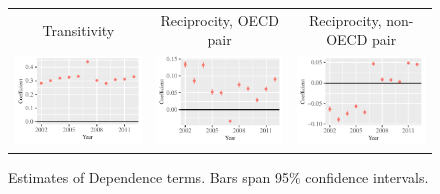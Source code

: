\documentclass[reqno,onecolumn,letterpaper,12pt]{article}
\begin{document}
{\begin{figure}[!h]
\centering
\begin{tabular}{@{\hskip -.05cm}c@{\hskip .1cm}c@{\hskip .1cm}c}
Transitivity  & Reciprocity, OECD pair &Reciprocity, non-OECD pair\\
\includegraphics[height=.16\textheight, clip=true, trim=.55cm .6cm .25cm .1cm]{SI_figures/xr_rl_plots/Transitivity.pdf}   &
\includegraphics[height=.16\textheight, clip=true, trim=.55cm .6cm .25cm .1cm]{SI_figures/xr_rl_plots/Mutuality_OECD.pdf}    &
\includegraphics[height=.16\textheight, clip=true, trim=.55cm .6cm .25cm .1cm]{SI_figures/xr_rl_plots/Mutuality_notOECD.pdf} \\
\end{tabular}
\caption{\label{fig:xr_netterms} Estimates of Dependence terms. Bars span 95\% confidence intervals. }
\end{figure}


}
\end{document}
